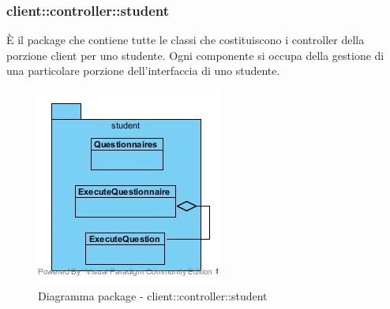 \vspace{0.5cm}
\subsubsection{client::controller::student}
È il package che contiene tutte le classi che costituiscono i controller della porzione client per uno studente. Ogni componente si occupa della gestione di una particolare porzione dell'interfaccia di uno studente.\begin{center}
	\begin{figure}[H]
		\centering \includegraphics[scale=4, max width=\textwidth, max height=\myheight]{../img/diagrammiClassi/client/controller/student.png}
		\caption{Diagramma package - client::controller::student}
	\end{figure}
\end{center}\hypertarget{client::controller::student::Questionnaires}{}
